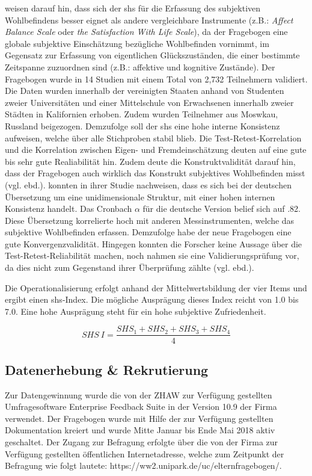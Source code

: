 weisen darauf hin, dass sich der \acrshort{shs} für die Erfassung des subjektiven Wohlbefindens besser eignet als andere vergleichbare Instrumente (z.B.: \textit{Affect Balance Scale} oder \textit{the Satisfaction With Life Scale}), da der Fragebogen eine globale subjektive Einschätzung bezügliche Wohlbefinden vornimmt, im Gegensatz zur Erfassung von eigentlichen Glückszuständen, die einer bestimmte Zeitspanne zuzuordnen sind (z.B.: affektive und kognitive Zustände). Der Fragebogen wurde in 14 Studien mit einem Total von 2,732 Teilnehmern validiert. Die Daten wurden innerhalb der vereinigten Staaten anhand von Studenten zweier Universitäten und einer Mittelschule von Erwachsenen innerhalb zweier Städten in Kalifornien erhoben. Zudem wurden Teilnehmer aus Moswkau, Russland beigezogen. Demzufolge soll der \acrshort{shs} eine hohe interne Konsistenz aufweisen, welche über alle Stichproben stabil blieb. Die Test-Retest-Korrelation und die Korrelation zwischen Eigen- und Fremdeinschätzung deuten auf eine gute bis sehr gute Realiabilität hin.  
Zudem deute die Konstruktvalidität darauf hin, dass der Fragebogen auch wirklich das Konstrukt subjektives Wohlbefinden misst (vgl. ebd.).  konnten in ihrer Studie nachweisen, dass es sich bei der deutschen Übersetzung um eine unidimensionale Struktur, mit einer hohen internen Konsistenz handelt. Das Cronbach $\alpha$ für die deutsche Version belief sich auf .82. Diese Übersetzung korrelierte hoch mit anderen Messinstrumenten, welche das subjektive Wohlbefinden erfassen. Demzufolge habe der neue Fragebogen eine gute Konvergenzvalidität. Hingegen konnten die Forscher keine Aussage über die Test-Retest-Reliabilität machen, noch nahmen sie eine Validierungsprüfung vor, da dies nicht zum Gegenstand ihrer Überprüfung zählte (vgl. ebd.).

Die Operationalisierung erfolgt anhand der Mittelwertsbildung der vier Items \cite{Lyubomirsky1999} und ergibt einen \acrshort{shs}-Index. Die mögliche Ausprägung dieses Index reicht von 1.0 bis 7.0. Eine hohe Ausprägung steht für ein hohe subjektive Zufriedenheit.

\begin{equation}\label{eq:SHS}
    SHS~I=\frac{SHS_{1}+SHS_{2}+SHS_{3}+SHS_{4}}{4}
\end{equation}

\subsection{Datenerhebung \& Rekrutierung}\label{sec:Datenerhebung}
Zur Datengewinnung wurde die von der ZHAW zur Verfügung gestellten Umfragesoftware Enterprise Feedback Suite in der Version 10.9 der Firma  verwendet. Der Fragebogen wurde mit Hilfe der zur Verfügung gestellten Dokumentation kreiert \cite{EFS2016} und wurde Mitte Januar bis Ende Mai 2018 aktiv geschaltet.  Der Zugang zur Befragung erfolgte über die von der Firma  zur Verfügung gestellten öffentlichen Internetadresse, welche zum Zeitpunkt der Befragung wie folgt lautete: https://ww2.unipark.de/uc/elternfragebogen/.

